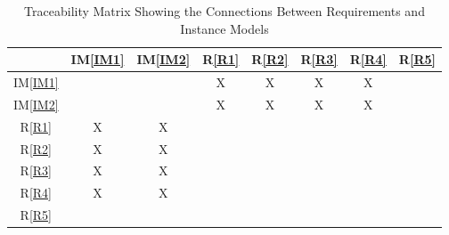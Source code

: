 \documentclass[12pt]{article}
\newcommand{\iref}[1]{IM\ref{#1}}
\newcommand{\rref}[1]{R\ref{#1}}
\begin{document}
\begin{table}[h!]
\centering
\begin{tabular}{|c|c|c|c|c|c|c|c|}
\hline
           & \iref{IM1} & \iref{IM2} & \rref{R1} & \rref{R2} & \rref{R3} & \rref{R4} & \rref{R5} \\
\hline
\iref{IM1} &            &            &    X      &    X      &    X      &   X       &           \\ \hline
\iref{IM2} &            &            &    X      &    X      &    X      &   X       &           \\ \hline
\rref{R1}  &      X     &     X      &           &           &           &           &           \\ \hline
\rref{R2}  &      X     &     X      &           &           &           &           &           \\ \hline
\rref{R3}  &      X     &     X      &           &           &           &           &           \\ \hline
\rref{R4}  &      X     &     X      &           &           &           &           &           \\ \hline
\rref{R5}  &            &            &           &           &           &           &           \\ \hline
\end{tabular}
\caption{Traceability Matrix Showing the Connections Between Requirements and Instance Models}
\label{Table:R_trace}
\end{table}


\end{document}

